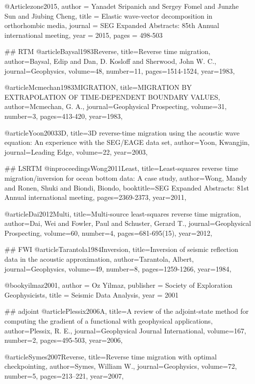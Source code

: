 @Article{zone2015,
  author = 	 {Yanadet Sripanich and Sergey Fomel and Junzhe Sun and Jiubing Cheng},
  title = 	 {Elastic wave-vector decomposition in orthorhombic media},
  journal = 	 {SEG Expanded Abstracts: 85th Annual international meeting},
  year = 	 2015,
  pages =	 {498-503}
}


## RTM
@article{Baysal1983Reverse,
  title={Reverse time migration},
  author={Baysal, Edip and Dan, D. Kosloff and Sherwood, John W. C.},
  journal={Geophysics},
  volume={48},
  number={11},
  pages={1514-1524},
  year={1983},
}

@article{Mcmechan1983MIGRATION,
  title={MIGRATION BY EXTRAPOLATION OF TIME‐DEPENDENT BOUNDARY VALUES},
  author={Mcmechan, G. A.},
  journal={Geophysical Prospecting},
  volume={31},
  number={3},
  pages={413-420},
  year={1983},
}

@article{Yoon20033D,
  title={3{D} reverse-time migration using the acoustic wave equation: An experience with the SEG/EAGE data set},
  author={Yoon, Kwangjin},
  journal={Leading Edge},
  volume={22},
  year={2003},
}

## LSRTM
@inproceedings{Wong2011Least,
  title={Least‐squares reverse time migration/inversion for ocean bottom data: A case study},
  author={Wong, Mandy and Ronen, Shuki and Biondi, Biondo},
  booktitle={SEG Expanded Abstracts: 81st Annual international meeting},
  pages={2369-2373},
  year={2011},
}

@article{Dai2012Multi,
  title={Multi-source least-squares reverse time migration},
  author={Dai, Wei and Fowler, Paul and Schuster, Gerard T.},
  journal={Geophysical Prospecting},
  volume={60},
  number={4},
  pages={681-695(15)},
  year={2012},
}

## FWI
@article{Tarantola1984Inversion,
  title={Inversion of seismic reflection data in the acoustic approximation},
  author={Tarantola, Albert},
  journal={Geophysics},
  volume={49},
  number={8},
  pages={1259-1266},
  year={1984},
}

@book{yilmaz2001,
   author = {Oz Yilmaz},
   publisher = {Society of Exploration Geophysicists},
   title = {Seismic Data Analysis},
   year = {2001}
}

## adjoint
@article{Plessix2006A,
  title={A review of the adjoint-state method for computing the gradient of a functional with geophysical applications},
  author={Plessix, R. E.},
  journal={Geophysical Journal International},
  volume={167},
  number={2},
  pages={495-503},
  year={2006},
}

@article{Symes2007Reverse,
  title={Reverse time migration with optimal checkpointing},
  author={Symes, William W.},
  journal={Geophysics},
  volume={72},
  number={5},
  pages={213--221},
  year={2007},
}


